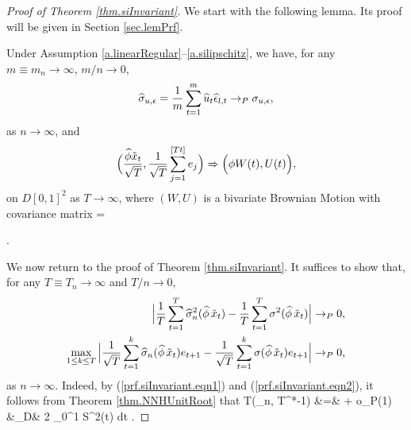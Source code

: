 \begin{proof}[Proof of Theorem \ref {thm.siInvariant}] 

We start with the following lemma. Its proof will be given in Section \ref{sec.lemPrf}.
\begin{lem} 
Under Assumption \ref{a.linearRegular}--\ref{a.silipschitz}, we have, for any $m \equiv m_n\to \infty$, $m / n \to 0$,
\begin{equation}\la{prop.covConsistent.eqn1}
\widehat{\si}_{u, \ep} = \frac{1}{m} \sum_{t = 1}^m \widehat{u}_t \widehat{\ep}_{l,t} \rightarrow_P \si_{u, \ep},
\end{equation}
as $n \to \infty$, and
\begin{equation}\la{prop.covConsistent.eqn2}
\Big ( \frac{\widehat{\phi}\tilde{x}_t}{\sqrt{T}}, \frac{1}{ \sqrt{T}} \sum_{j = 1}^{[Tt]} e_j \Big) \Rightarrow \Big(\phi W(t), U(t) \Big ),
\end{equation}
on $D[0,1]^2$ as $T \to \infty$, where $(W,U)$ is a bivariate Brownian Motion with covariance matrix
\be
\Delta = .
\ee
\end{lem}


We now return to the proof of Theorem \ref {thm.siInvariant}.
It suffices to show that, for any $T \equiv T_n \to \infty$ and $T / n \to 0$,
\begin{align}
\la{prf.siInvariant.eqn1} \Big | \frac{1}{T}\sum_{t=1}^T \widehat{\si}_n^2(\widehat\phi\, \tilde{x}_{t}) - \frac{1}{T} \sum_{t=1}^T \si^2(\widehat{\phi}\,\tilde{x}_{t}) \Big |& \rightarrow_P 0,  \\
\la{prf.siInvariant.eqn2} \max_{1 \le k \le T} \Big | \frac{1}{\sqrt{T}}\sum_{t=1}^k \widehat{\si}_n(\widehat\phi\, \tilde{x}_{t})e_{t+1} - \frac{1}{\sqrt{T}} \sum_{t=1}^k \si(\widehat{\phi}\,\tilde{x}_{t}) e_{t+1}\Big |& \rightarrow_P 0,
\end{align}
as $n \to \infty$. Indeed, by (\ref {prf.siInvariant.eqn1}) and (\ref {prf.siInvariant.eqn2}), it follows from Theorem \ref{thm.NNHUnitRoot} that
\bestar
T(\widehat \al_{n, T}^*-1) &=&  + o_P(1) \no\\
&\rightarrow_D&  { 2 \int_{0}^{1} S^2(t) dt }.
\eestar


\end{proof}
